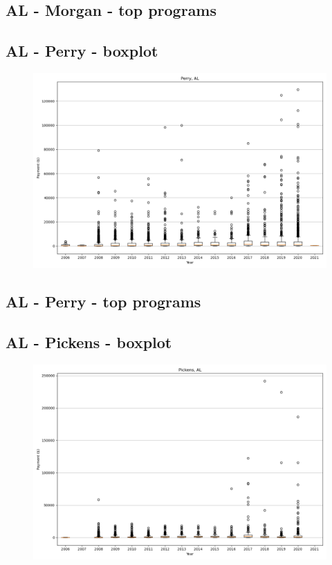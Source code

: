 \subsection*{AL - Morgan - top programs}

\newpage
\subsection*{AL - Perry - boxplot}
\begin{figure}[h]
\centering
\includegraphics[width=7in]{../output/boxplots/counties/Perry-AL_boxplot.png}
\end{figure}


\subsection*{AL - Perry - top programs}

\newpage
\subsection*{AL - Pickens - boxplot}
\begin{figure}[h]
\centering
\includegraphics[width=7in]{../output/boxplots/counties/Pickens-AL_boxplot.png}
\end{figure}


